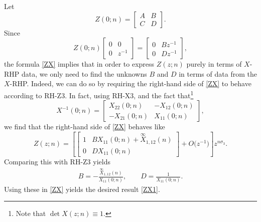 \documentclass[10pt,a4paper]{amsart}
\numberwithin{equation}{section}
\begin{document}
	Let \begin{equation*}
		Z(0;n) = \begin{bmatrix}
			A & B \\
			C & D
		\end{bmatrix}.
	\end{equation*}
	Since
	\[ Z(0;n) \begin{bmatrix}
		0 & 0 \\
		0 & z^{-1}
	\end{bmatrix} = \begin{bmatrix}
		0 & Bz^{-1} \\
		0 & Dz^{-1}
	\end{bmatrix}, \]
	the formula \eqref{ZX} implies that in order to express $Z(z;n)$ purely in terms of $X$-RHP data, we only need to find the unknowns $B$ and $D$ in terms of data from the $X$-RHP. Indeed, we can do so by requiring the right-hand side of \eqref{ZX} to behave according to {\rm RH-Z3}. In fact, using {\rm RH-X3}, and the fact that\footnote{Note that $\det X(z;n) \equiv 1$.}
	\begin{equation*}
		X^{-1}(0;n) = \begin{bmatrix}
			X_{22}(0;n) & -X_{12}(0;n) \\
			-X_{21}(0;n) & X_{11}(0;n)
		\end{bmatrix},
	\end{equation*}
	we find that the right-hand side of \eqref{ZX} behaves like
	\begin{equation*}
		Z(z;n) = \left[ \begin{bmatrix}
			1 & B X_{11}(0;n)+\overset{\infty}{X}_{1,12}(n) \\
			0 & D X_{11}(0;n)
		\end{bmatrix} + O\big(z^{-1}\big) \right] z^{n\sigma_3}.
	\end{equation*}
	Comparing this with {\rm RH-Z3} yields
	\begin{align*}
		B = - \frac{\overset{\infty}{X}_{1,12}(n)}{X_{11}(0;n)}, \qquad
		D = \frac{1}{X_{11}(0;n)}.
	\end{align*}
	Using these in \eqref{ZX} yields the desired result \eqref{ZX1}.
	
\end{document}
